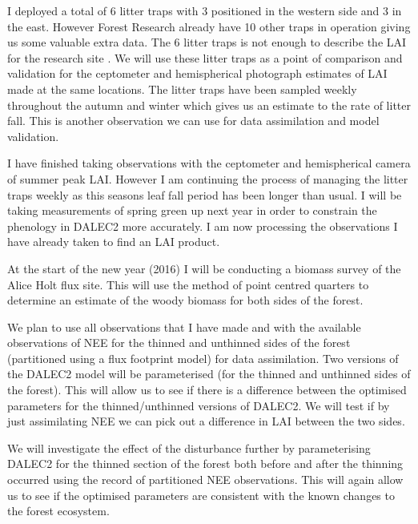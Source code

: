 \documentclass[11pt]{article}
\begin{document}
I deployed a total of 6 litter traps with 3 positioned in the western side and 3 in the east. However Forest Research already have 10 other traps in operation giving us some valuable extra data. The 6 litter traps is not enough to describe the LAI for the research site \citep{kimmins1973some}. We will use these litter traps as a point of comparison and validation for the ceptometer and hemispherical photograph estimates of LAI made at the same locations. The litter traps have been sampled weekly throughout the autumn and winter which gives us an estimate to the rate of litter fall. This is another observation we can use for data assimilation and model validation.

I have finished taking observations with the ceptometer and hemispherical camera of summer peak LAI. However I am continuing the process of managing the litter traps weekly as this seasons leaf fall period has been longer than usual. I will be taking measurements of spring green up next year in order to constrain the phenology in DALEC2 more accurately. I am now processing the observations I have already taken to find an LAI product. 

At the start of the new year (2016) I will be conducting a biomass survey of the Alice Holt flux site. This will use the method of point centred quarters \citep{dahdouh2006empirical} to determine an estimate of the woody biomass for both sides of the forest. 

We plan to use all observations that I have made and with the available observations of NEE for the thinned and unthinned sides of the forest (partitioned using a flux footprint model) for data assimilation. Two versions of the DALEC2 model will be parameterised (for the thinned and unthinned sides of the forest). This will allow us to see if there is a difference between the optimised parameters for the thinned/unthinned versions of DALEC2. We will test if by just assimilating NEE we can pick out a difference in LAI between the two sides. 

We will investigate the effect of the disturbance further by parameterising DALEC2 for the thinned section of the forest both before and after the thinning occurred using the record of partitioned NEE observations. This will again allow us to see if the optimised parameters are consistent with the known changes to the forest ecosystem.   
\end{document}
